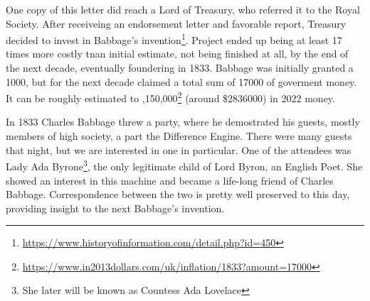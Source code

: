 \documentclass[../../what-is-computer]{subfiles}
\begin{document}
    One copy of this letter did reach a Lord of Treasury, who referred it to the Royal Society. After receiveing an endorsement letter and favorable report, Treasury
    decided to invest in Babbage's invention\footnote{\href{https://www.historyofinformation.com/detail.php?id=450}{https://www.historyofinformation.com/detail.php?id=450}}.
    Project ended up being at least 17 times more costly tnan initial estimate, not being finished at all, by the end of the next decade, eventually foundering in 1833. Babbage
    was initially granted a \textsterling\num{1000}, but for the next decade claimed a total sum of \textsterling\num{17000} of goverment money. It can be roughly estimated to
    ,150,000\footnote{\href{https://www.in2013dollars.com/uk/inflation/1833?amount=17000}{https://www.in2013dollars.com/uk/inflation/1833?amount=17000}}
    (around \$\num{2836000}) in 2022 money. \par

    In 1833 Charles Babbage threw a party, where he demostrated his guests, mostly members of high society, a part the Difference Engine. There were many
    guests that night, but we are interested in one in particular. One of the attendees was Lady Ada Byrone\footnote{She later will be known as Countess Ada Lovelace},
    the only legitimate child of Lord Byron, an English Poet. She showed an interest in this machine and became a life-long friend of Charles Babbage.
    Correspondence between the two is pretty well preserved to this day, providing insight to the next Babbage's invention. \par
\end{document}
